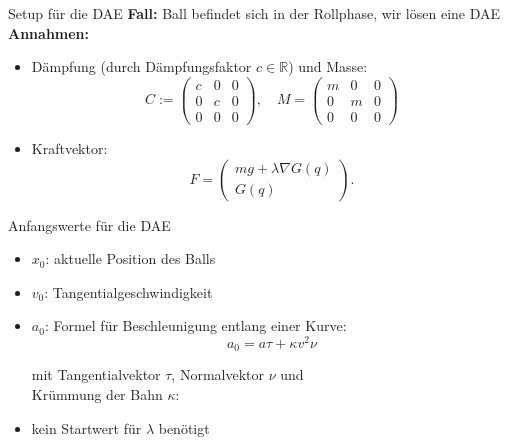 \documentclass{beamer}
\begin{document}
\begin{frame}{Setup für die DAE}
\textbf{Fall:} Ball befindet sich in der Rollphase, wir lösen eine DAE\\
\vspace{0.3cm}
\textbf{Annahmen:}
\begin{itemize}
	\item Dämpfung (durch Dämpfungsfaktor $c \in \mathbb{R}$) und Masse: 
	\begin{equation*}
		C :=
		\begin{pmatrix}
			c & 0 & 0\\
			0 & c & 0\\
			0 & 0 & 0
		\end{pmatrix},
		\quad
		M =
		\begin{pmatrix}
			m & 0 & 0 \\
			0 & m & 0 \\
			0 & 0 & 0
		\end{pmatrix}
	\end{equation*}
	\item Kraftvektor: 
	\[F = 
	\begin{pmatrix}
		mg + \lambda \nabla G(q)\\
		G(q)
	\end{pmatrix}.
	\]
\end{itemize} 

\end{frame}


\begin{frame}{Anfangswerte für die DAE}
	
\begin{itemize}
	\item $x_0$: aktuelle Position des Balls
	\item $v_0$: Tangentialgeschwindigkeit
	\item $a_0$: Formel für Beschleunigung entlang einer Kurve:
	\[
	a_0 = a \tau + \kappa v^2 \nu
	\]
	
	\qquad mit Tangentialvektor $\tau$, Normalvektor $\nu$ und\\
	\qquad Krümmung der Bahn $\kappa$: 
	
	\item kein Startwert für $\lambda$ benötigt
\end{itemize}

\end{frame}
	
\end{document}
